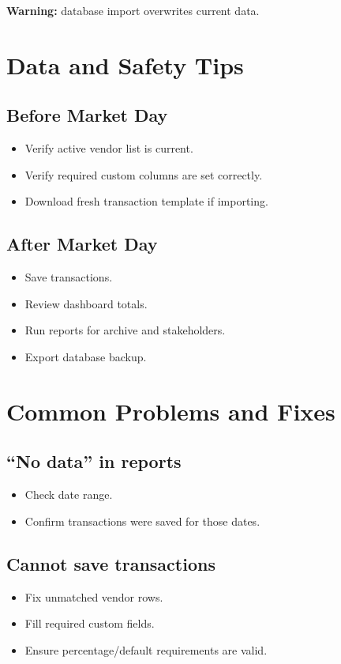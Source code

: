 \documentclass[11pt]{article}
\begin{document}
\textbf{Warning:} database import overwrites current data.

\section{Data and Safety Tips}
\subsection{Before Market Day}
\begin{itemize}
  \item Verify active vendor list is current.
  \item Verify required custom columns are set correctly.
  \item Download fresh transaction template if importing.
\end{itemize}

\subsection{After Market Day}
\begin{itemize}
  \item Save transactions.
  \item Review dashboard totals.
  \item Run reports for archive and stakeholders.
  \item Export database backup.
\end{itemize}

\section{Common Problems and Fixes}
\subsection{``No data'' in reports}
\begin{itemize}
  \item Check date range.
  \item Confirm transactions were saved for those dates.
\end{itemize}

\subsection{Cannot save transactions}
\begin{itemize}
  \item Fix unmatched vendor rows.
  \item Fill required custom fields.
  \item Ensure percentage/default requirements are valid.
\end{itemize}
\end{document}
